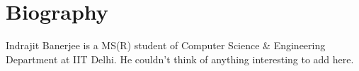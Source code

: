
\chapter*{Biography}

Indrajit Banerjee is a MS(R) student of Computer Science \& Engineering Department at IIT Delhi.
He couldn't think of anything interesting to add here.
